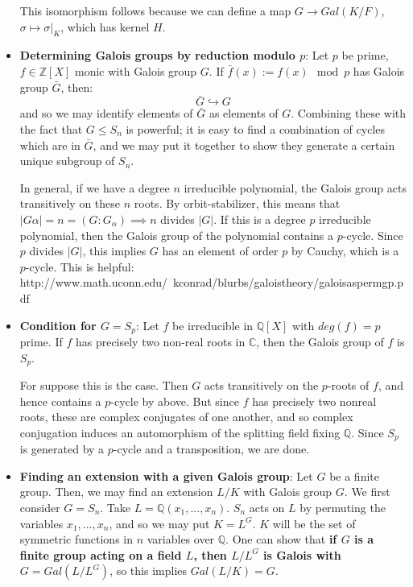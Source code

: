 \documentclass[11pt, oneside]{amsart}   	%
\theoremstyle{definition}
\begin{document}
\begin{itemize}
	This isomorphism follows because we can define a map $G\rightarrow Gal(K / F)$, $\sigma\mapsto \sigma |_K$, which has kernel $H$. 
	
	\item \textbf{Determining Galois groups by reduction modulo $p$}: Let $p$ be prime, $f\in\mathbb Z[X]$ monic with Galois group $G$. If $\bar f(x) := 
	f(x)\mod p$ has Galois group $\bar G$, then:
	$$
		\bar G\hookrightarrow G
	$$
	and so we may identify elements of $\bar G$ as elements of $G$. Combining these with the fact that $G\leq S_n$ is powerful; it is easy to find a 
	combination of cycles which are in $\bar G$, and we may put it together to show they generate a certain unique subgroup of $S_n$.
	
	In general, if we have a degree $n$ irreducible polynomial, the Galois group acts transitively on these $n$ roots. By orbit-stabilizer, this means that 
	$|G\alpha| = n = (G : G_\alpha)\implies n$ divides $|G|$.  If this is a degree $p$ irreducible polynomial, then the Galois group of the polynomial 
	contains a $p$-cycle. Since $p$ divides $|G|$, this implies $G$ has an element of order $p$ by Cauchy, which is a $p$-cycle. This is helpful: 
	http://www.math.uconn.edu/~kconrad/blurbs/galoistheory/galoisaspermgp.pdf
	
	\item \textbf{Condition for $G = S_p$}: Let $f$ be irreducible in $\mathbb Q[X]$ with $deg(f) = p$ prime. If $f$ has precisely two non-real roots in $
	\mathbb C$, then the Galois group of $f$ is $S_p$.
	
	For suppose this is the case. Then $G$ acts transitively on the $p$-roots of $f$, and hence contains a $p$-cycle by above. But since $f$ has 
	precisely two nonreal roots, these are complex conjugates of one another, and so complex conjugation induces an automorphism of the splitting 
	field fixing $\mathbb Q$. Since $S_p$ is generated by a $p$-cycle and a transposition, we are done.
	
	\item \textbf{Finding an extension with a given Galois group}: Let $G$ be a finite group. Then, we may find an extension $L / K$ with Galois group $G$. 
	We first consider $G = S_n$. Take $L = \mathbb Q(x_1, ..., x_n)$. $S_n$ acts on $L$ by permuting the variables $x_1, ..., x_n$, and so we may put 
	$K = L^G$. $K$ will be the set of symmetric functions in $n$ variables over $\mathbb Q$. One can show that \textbf{if $G$ is a finite group acting on a 
	field $L$, then $L / L^G$ is Galois with $G = Gal(L / L^G)$}, so this implies $Gal(L / K) = G$. 
	

\end{itemize}
\end{document}
